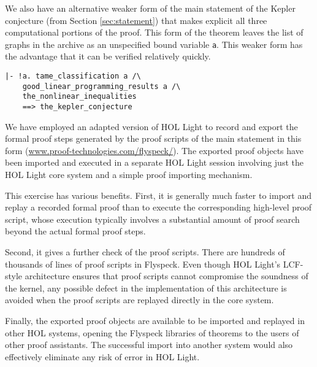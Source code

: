 We also have an alternative weaker form of the main statement of the
Kepler conjecture (from Section \ref{sec:statement}) that makes
explicit all three computational portions of the proof.  This form of
the theorem leaves the list of graphs in the archive as an unspecified
bound variable \verb!a!.  This weaker form has the advantage that it
can be verified relatively quickly.

\begin{obeylines}

\begin{verbatim}
|- !a. tame_classification a /\
    good_linear_programming_results a /\ 
    the_nonlinear_inequalities
    ==> the_kepler_conjecture
\end{verbatim}

\end{obeylines}

We have employed an adapted version of HOL Light to record and export
the formal proof steps generated by the proof scripts of the main
statement in this form (\url{www.proof-technologies.com/flyspeck/}).
The exported proof objects have been imported and executed in a
separate HOL Light session involving just the HOL Light core system
and a simple proof importing mechanism.  

This exercise has various benefits.  First, it is generally much
faster to import and replay a recorded formal proof than to execute
the corresponding high-level proof script, whose execution typically
involves a substantial amount of proof search beyond the actual formal
proof steps.

Second, it gives a further check of the proof scripts.
There are hundreds of thousands of lines of proof scripts in Flyspeck.
Even though HOL Light's LCF-style architecture ensures that proof
scripts cannot compromise the soundness of the kernel, any possible
defect in the implementation of this architecture is avoided when the
proof scripts are replayed directly in the core system.

Finally, the exported proof objects are available to be imported and
replayed in other HOL systems, opening the Flyspeck libraries of
theorems to the users of other proof assistants.  The successful
import into another system would also effectively eliminate any risk
of error in HOL Light.



